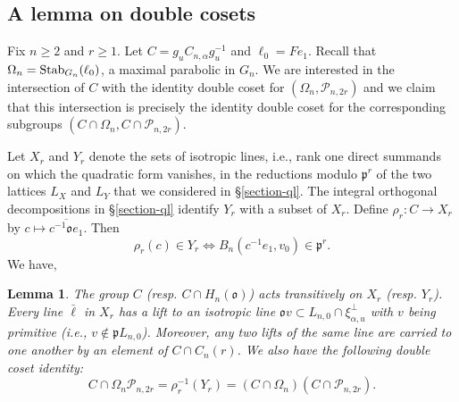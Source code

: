 \documentclass[12pt]{amsart}
\newtheorem{lemma}[theorem]{Lemma}%
\theoremstyle{definition}
\theoremstyle{remark}
\begin{document}
\subsection{A lemma on double cosets}\label{section-lemma-dc}

Fix $n \geq 2$ and $r\geq 1$. Let $C=g_uC_{n,\alpha}g_u^{-1}$ and $\ell_0=Fe_1$. Recall that $\Omega_n= {\rm Stab}_{G_n}(\ell_0)$, a maximal parabolic in $G_n$. We are interested in the intersection of $C$ with the identity double coset for $(\Omega_n,\mathcal P_{n,2r})$ and we claim that this intersection is precisely the identity double coset for the corresponding subgroups $(C \cap \Omega_n,C \cap \mathcal P_{n,2r})$. 

Let $X_r$ and $Y_r$ denote the sets of isotropic lines, i.e., rank one direct summands on which the quadratic form vanishes, in the reductions modulo $\mathfrak p^r$ of the two lattices $L_X$ and $L_Y$ that we considered in \S \ref{section-ql}. The integral orthogonal decompositions in \S \ref{section-ql} identify $Y_r$ with a subset of $X_r$. Define
$
\rho_r:C\rightarrow X_r$ by $
c \mapsto\overline{c^{-1}\mathfrak o e_1}$. Then
\[
\rho_r(c)\in Y_r
\iff  
B_n(c^{-1}e_1,v_0)\in\mathfrak p^r.
\]
We have,
\begin{lemma}\label{lemma-dc}
The group $C$ (resp. $C\cap H_n(\mathfrak o)$) acts transitively on $X_r$ (resp. $Y_r$). Every line $\bar{\ell}$ in $X_r$ has a lift to an isotropic line
$
\mathfrak o v\subset L_{n,0}\cap\xi_{\alpha,u}^{\perp}
$
with $v$ being primitive (i.e., $v\notin\mathfrak pL_{n,0}$). Moreover, any two lifts of the same line are carried to one another by an element of $C\cap C_n(r)$. We also have the following double coset identity:
\[
C\cap \Omega_n\mathcal P_{n,2r}
=\rho_r^{-1}(Y_r)
=(C\cap \Omega_n)(C\cap\mathcal P_{n,2r}).
\]
\end{lemma}
\end{document}
